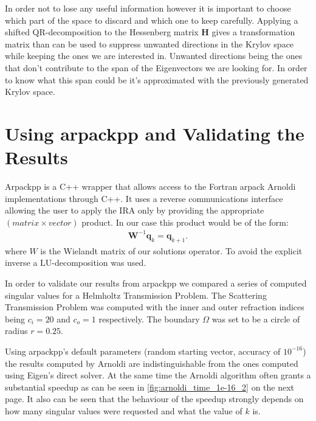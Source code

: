 \documentclass[a4paper, oneside]{discothesis}
\begin{document}
In order not to lose any useful information however it is important to choose which part of the space to discard and which one to keep carefully.
Applying a shifted QR-decomposition to the Hessenberg matrix $\mathbf{H}$ gives a transformation matrix than can be used to suppress unwanted directions in the Krylov space while keeping the ones we are interested in.
Unwanted directions being the ones that don't contribute to the span of the Eigenvectors we are looking for.
In order to know what this span could be it's approximated with the previously generated Krylov space.

\section{Using arpackpp and Validating the Results}\label{sec:first_results}
Arpackpp is a C++ wrapper that allows access to the Fortran arpack\cite{arpackweb} Arnoldi implementations through C++.
It uses a reverse communications interface allowing the user to apply the IRA only by providing the appropriate $(matrix\times vector)$ product.
In our case this product would be of the form:
\begin{align}
	\mathbf{W}^{-1} \mathbf{q}_k = \mathbf{q}_{k+1}.
\end{align}
where $W$ is the Wielandt matrix of our solutions operator.
To avoid the explicit inverse a LU-decomposition was used.

In order to validate our results from arpackpp we compared a series of computed singular values for a Helmholtz Transmission Problem.
The Scattering Transmission Problem was computed with the inner and outer refraction indices being $c_i=20$ and $c_o=1$ respectively.
The boundary $\Omega$ was set to be a circle of radius $r=0.25$.

Using arpackpp's default parameters (random starting vector, accuracy of $10^{-16}$) the results computed by Arnoldi are indistinguishable from the ones computed using Eigen's direct solver.
At the same time the Arnoldi algorithm often grants a substantial speedup as can be seen in \ref{fig:arnoldi_time_1e-16_2} on the next page.
It also can be seen that the behaviour of the speedup strongly depends on how many singular values were requested and what the value of $k$ is.
\end{document}
